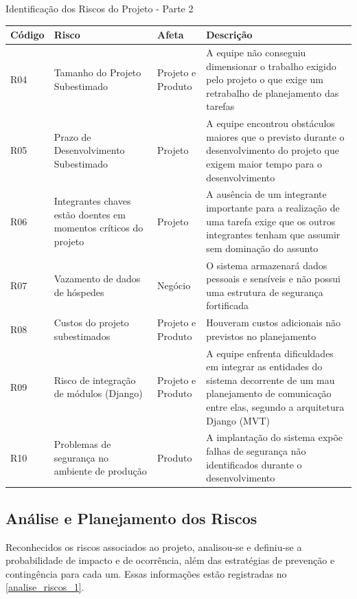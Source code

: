 \documentclass[
	12pt,				%
	openany,			%
	twoside,			%
	a4paper,			%
	english,			%
	french,				%
	spanish,			%
	brazil				%
	]{abntex2}
\begin{document}
			
\begin{quadro} [H]
	\caption{Identificação dos Riscos do Projeto - Parte 2} \label{identificacao_riscos_2} 
	\begin{tabular}{|p{2.8cm}|p{5cm}|p{3cm}|p{4.2cm}|}
		\hline
		\textbf{Código} & \textbf{Risco} & \textbf{Afeta} & \textbf{Descrição}  \\
		\hline			
			R04 & Tamanho do Projeto Subestimado &
			Projeto e Produto  & A equipe não conseguiu dimensionar o trabalho exigido pelo projeto o que exige um retrabalho de planejamento das tarefas \\
		\hline
			R05 & Prazo de Desenvolvimento Subestimado &
			Projeto & A equipe encontrou obstáculos maiores que o previsto durante o desenvolvimento do projeto que exigem maior tempo para o desenvolvimento \\
		\hline
			R06 & 	Integrantes chaves estão doentes em momentos críticos do projeto & Projeto & A ausência de um integrante importante para a realização de uma tarefa exige que os outros integrantes tenham que assumir sem dominação do assunto \\
		\hline
			R07 & Vazamento de dados de hóspedes & Negócio & O sistema  armazenará dados pessoais e sensíveis e não possui uma estrutura de segurança fortificada \\
		\hline
			R08 & Custos do projeto subestimados & Projeto e Produto & Houveram custos adicionais não previstos no planejamento \\
		\hline
		R09 & Risco de integração de módulos (Django) & Projeto e Produto & A equipe enfrenta dificuldades em integrar as entidades do sistema decorrente de um mau planejamento de comunicação entre elas, segundo a arquitetura Django (MVT) \\
		\hline
		R10 & Problemas de segurança no ambiente de produção & Produto & A implantação do sistema expõe falhas de segurança não identificados durante o desenvolvimento \\
		\hline
\end{tabular}
\end{quadro}			
\subsection{Análise e Planejamento dos Riscos}
 Reconhecidos os riscos associados ao projeto, analisou-se e definiu-se a probabilidade de impacto e de ocorrência, além das estratégias de prevenção e contingência para cada um. Essas informações estão registradas no \autoref{analise_riscos_1}.
 
\end{document}
